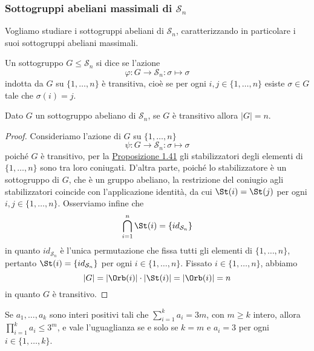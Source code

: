 \documentclass[11pt]{scrartcl}
\begin{document}
	\subsubsection{Sottogruppi abeliani massimali di $\mathcal{S}_n$}
	
	Vogliamo studiare i sottogruppi abeliani di $\mathcal{S}_n$, caratterizzando in particolare
	i suoi sottogruppi abeliani massimali.
	
	\begin{definition}
		Un sottogruppo $G\leqslant \mathcal{S}_n$ si dice  se l'azione
		\[
		\varphi: G\longrightarrow \mathcal{S}_n :\sigma \longmapsto \sigma
		\]indotta da $G$ su $\{1, \ldots, n\}$ è transitiva, cioè se per ogni
		$i, j \in \{1, \ldots, n\}$ esiste $\sigma \in G$ tale che $\sigma(i) = j$.
	\end{definition}
	
	\begin{lemma}
		\label{lemma1.54}
		Dato $G$ un sottogruppo abeliano di $\mathcal{S}_n$, se $G$ è transitivo allora $|G| = n$.
	\end{lemma}
	
	\begin{proof}
		Consideriamo l'azione di $G$ su $\{1, \ldots, n\}$
		\[
		\psi : G\longrightarrow \mathcal{S}_n :\sigma \longmapsto \sigma
		\]
		poiché $G$ è transitivo, per la \hyperref[prop1.41]{Proposizione 1.41}
		gli stabilizzatori degli elementi di $\{1, \ldots, n\}$ sono tra loro coniugati.
		D'altra parte, poiché lo stabilizzatore è un sottogruppo di $G$, che
		è un gruppo abeliano, la restrizione del coniugio agli
		stabilizzatori coincide con l'applicazione identità, da cui $\St(i) = \St(j)$
		per ogni $i, j \in \{1, \ldots, n\}$. Osserviamo infine che 
		\[
		\bigcap_{i = 1}^n \St(i) = \{id_{\mathcal{S}_n}\}
		\]in quanto $id_{\mathcal{S}_n}$ è l'unica permutazione che fissa tutti gli elementi
		di $\{1, \ldots, n\}$, pertanto $\St(i) = \{id_{\mathcal{S}_n}\}$ per ogni $i \in \{1, \ldots, n\}$.
		Fissato $i \in \{1, \ldots, n\}$, abbiamo 
		\[
		|G| = |\Orb(i)|\cdot|\St(i)| = |\Orb(i)| = n
		\]
		in quanto $G$ è transitivo.
	\end{proof}
	
	\begin{lemma}
		\label{lemma1.55}
		Se $a_1, \ldots, a_k$ sono interi positivi tali che $\displaystyle
		\sum_{i = 1}^k a_i = 3m$,
		con $m \geqslant k$ intero, allora $\displaystyle
		\prod_{i = 1}^k a_i \leq 3^m$, 
		e vale l'uguaglianza se e solo se $k = m$ e $a_i = 3$ per ogni $i \in \{1, \ldots, k\}$.
	\end{lemma}
	
\end{document}
